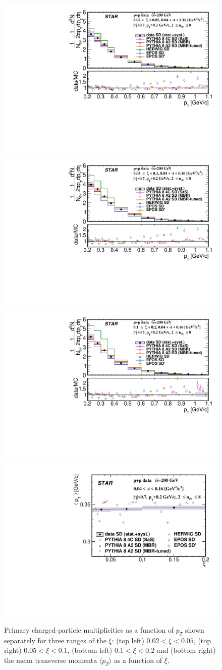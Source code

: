 \begin{figure}[bh]
	\centering
	\includegraphics[width=.49\textwidth,page=1]{chapters/chrgSTAR/img/results/out_pt_ksi_0.pdf}
	\hfill
	\includegraphics[width=.49\textwidth,page=1]{chapters/chrgSTAR/img/results/out_pt_ksi_1.pdf}
	\newline
	\includegraphics[width=.49\textwidth,page=1]{chapters/chrgSTAR/img/results/out_pt_ksi_2.pdf}
	\hfill
	\includegraphics[width=.49\textwidth,page=1]{chapters/chrgSTAR/img/results/mean_pt_xi.pdf}
	\caption[Primary charged-particle multiplicities as a function of $p_T$ shown separately for three ranges of the $\xi$ and the mean transverse momenta $\langle p_T\rangle$ as a function of $\xi$.]{Primary charged-particle multiplicities as a function of $p_T$ shown separately for three ranges of the $\xi$: (top left) $0.02<\xi<0.05$, (top right) $0.05<\xi<0.1$, (bottom left) $0.1<\xi<0.2$ and (bottom right) the mean transverse momenta $\langle p_T\rangle$ as a function of $\xi$.}
	\label{results_star_pt}
\end{figure}

